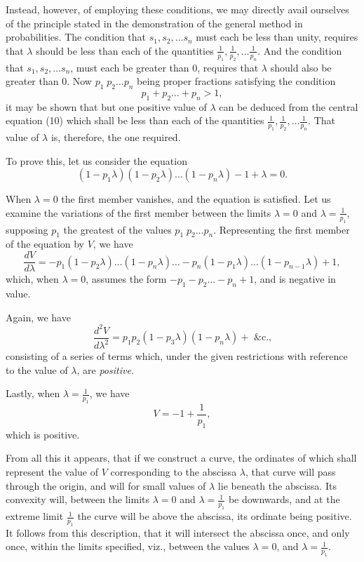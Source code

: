 \documentclass[oneside]{book}
\begin{document}
Instead, however, of employing these conditions, we may
directly avail ourselves of the principle stated in the demonstration of the general method in probabilities. The condition
that $s_1, s_2, \dotsc s_n$ must each be less than unity, requires that $\lambda$
should be less than each of the quantities
$\frac{1}{p_1}, \frac{1}{p_2}, \dotsc \frac{1}{p_n}$. And
the condition that $s_1, s_2, \dotsc s_n$, must each be greater than 0, requires that $\lambda$ should also be greater than 0. Now
$p_1 \; p_2 \dotsc p_n$
being proper fractions satisfying the condition
\[
  p_1 + p_2 \dotsc + p_n > 1,
\]
it may be shown that but one positive value of $\lambda$ can be deduced
from the central equation (10) which shall be less than each of
the quantities
$\frac{1}{p_1}, \frac{1}{p_2}, \dotsc \frac{1}{p_n}$. That value of $\lambda$ is, therefore, the
one required.

To prove this, let us consider the equation
\[
  (1 - p_1\lambda)(1 - p_2\lambda) \dotsc (1 - p_n\lambda)
  - 1  + \lambda = 0.
\]

When $\lambda = 0$ the first member vanishes, and the equation is
satisfied. Let us examine the variations of the first member
between the limits $\lambda = 0$ and $\lambda = \frac{1}{p_1}$, supposing $p_1$ the greatest of
the values $p_1 \; p_2 \dotsc p_n$.
Representing the first member of the equation by $V$, we have
\[
  \frac{dV}{d\lambda}
  = -p_1(1-p_2\lambda) \dotsc (1-p_n\lambda) \dotsc
    -p_n(1-p_1\lambda) \dotsc (1-p_{n-1}\lambda) + 1,
\]
which, when $\lambda = 0$, assumes the form
$-p_1 - p_2 \dotsc - p_n + 1$, and
is negative in value.

Again, we have
\[
  \frac{d^2V}{d\lambda^2}
  = p_1p_2(1-p_3\lambda)(1-p_n\lambda) + \text{ \&c.,}
\]
consisting of a series of terms which, under the given restrictions
with reference to the value of $\lambda$, are \emph{positive}.

Lastly, when $\lambda = \frac{1}{p_1}$, we have
\[
  V = -1 + \frac{1}{p_1},
\]
which is positive.

From all this it appears, that if we construct a curve, the ordinates of which shall represent the value of $V$ corresponding to
the abscissa $\lambda$, that curve will pass through the origin, and will
for small values of $\lambda$ lie beneath the abscissa. Its convexity will,
between the limits $\lambda = 0$ and $\lambda = \frac{1}{p_1}$ be downwards, and at the
extreme limit $\frac{1}{p_1}$ the curve will be above the abscissa, its ordinate
being positive. It follows from this description, that it will intersect the abscissa once, and only once, within the limits specified, viz., between the values $\lambda = 0$, and
$\lambda = \frac{1}{p_1}$.
\end{document}
